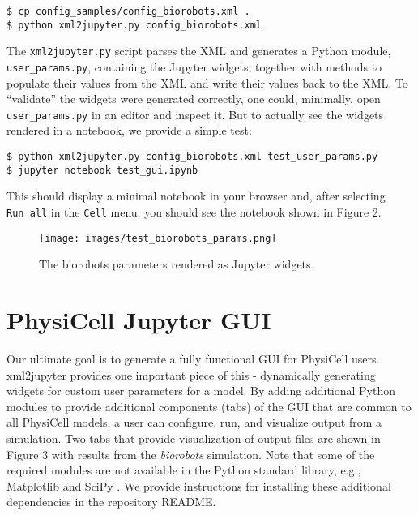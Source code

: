 \documentclass[10pt,letterpaper]{article}
\begin{document}
\begin{verbatim}
$ cp config_samples/config_biorobots.xml .
$ python xml2jupyter.py config_biorobots.xml
\end{verbatim}

The \texttt{xml2jupyter.py} script parses the XML and generates a Python
module, \newline
\texttt{user\_params.py}, containing the Jupyter widgets,
together with methods to populate their values from the XML and write
their values back to the XML. To ``validate'' the widgets were generated
correctly, one could, minimally, open \texttt{user\_params.py} in an
editor and inspect it. But to actually see the widgets rendered in a
notebook, we provide a simple test:

\begin{verbatim}
$ python xml2jupyter.py config_biorobots.xml test_user_params.py
$ jupyter notebook test_gui.ipynb
\end{verbatim}

This should display a minimal notebook in your browser and, after
selecting \texttt{Run\ all} in the \texttt{Cell} menu, you should see
the notebook shown in Figure 2.

\begin{figure}
\centering
\texttt{[image: images/test\_biorobots\_params.png]}
\captionsetup{justification=centering}
\caption{The biorobots parameters rendered as Jupyter widgets.}
\end{figure}

\hypertarget{physicell-jupyter-gui}{%
\section{PhysiCell Jupyter GUI}\label{physicell-jupyter-gui}}

Our ultimate goal is to generate a fully functional GUI for PhysiCell
users. xml2jupyter provides one important piece of this - dynamically
generating widgets for custom user parameters for a model. By adding
additional Python modules to provide additional components (tabs) of the
GUI that are common to all PhysiCell models, a user can configure, run,
and visualize output from a simulation. Two tabs that provide
visualization of output files are shown in Figure 3 with results from
the \emph{biorobots} simulation. Note that some of the required modules
are not available in the Python standard library, e.g., Matplotlib
\cite{Hunter:2007} and SciPy \cite{Oliphant:2007:PSC:1251563.1251830}. We provide instructions for
installing these additional dependencies in the repository README.
\end{document}
